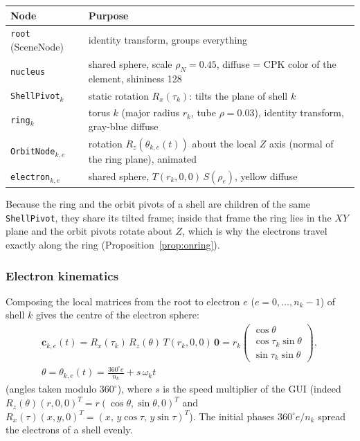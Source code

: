 \documentclass[a4paper, 11pt]{article}
\newcommand{\code}[1]{\texttt{#1}}
\begin{document}
\begin{center}
\small
\begin{tabularx}{\textwidth}{@{}lX@{}}
\toprule
\textbf{Node} & \textbf{Purpose}\\
\midrule
\code{root} (SceneNode) & identity transform, groups everything\\

\quad\code{nucleus} & shared sphere, scale $\rho_N=0.45$, diffuse = CPK color of the element, shininess 128\\

\quad\code{ShellPivot}$_k$ & static rotation $R_x(\tau_k)$: tilts the plane of shell $k$\\

\quad\code{ring}$_k$ & torus $k$ (major radius $r_k$, tube $\rho=0.03$), identity transform, gray-blue diffuse\\

\quad\code{OrbitNode}$_{k,e}$ & rotation $R_z(\theta_{k,e}(t))$ about the local $Z$ axis (normal of the ring plane), animated\\

\quad\code{electron}$_{k,e}$ & shared sphere, $T(r_k,0,0)\,S(\rho_e)$, yellow diffuse\\

\bottomrule
\end{tabularx}
\end{center}

Because the ring and the orbit pivots of a shell are children of the same \code{ShellPivot}, they share its tilted frame; inside that frame
the ring lies in the $XY$ plane and the orbit pivots rotate about $Z$, which is why the electrons travel exactly along the ring
(Proposition~\ref{prop:onring}).

\subsubsection{Electron kinematics}\label{sec:kin}

Composing the local matrices from the root to electron $e$ ($e=0,\dots,n_k-1$) of shell $k$ gives the centre of the electron sphere:
\begin{gather}
  \mathbf c_{k,e}(t)=R_x(\tau_k)\,R_z(\theta)\,T(r_k,0,0)\,\mathbf 0
  = r_k\begin{pmatrix}\cos\theta\\ \cos\tau_k\sin\theta\\ \sin\tau_k\sin\theta\end{pmatrix},\nonumber\\
  \theta=\theta_{k,e}(t)=\frac{360^\circ e}{n_k}+s\,\omega_k t
  \label{eq:electron}
\end{gather}
(angles taken modulo $360^\circ$), where $s$ is the speed multiplier of the GUI (indeed $R_z(\theta)(r,0,0)^T=r(\cos\theta,\sin\theta,0)^T$ and $R_x(\tau)(x,y,0)^T=(x,\,y\cos\tau,\,y\sin\tau)^T$).
The initial phases $360^\circ e/n_k$ spread the electrons of a shell evenly.
\end{document}
